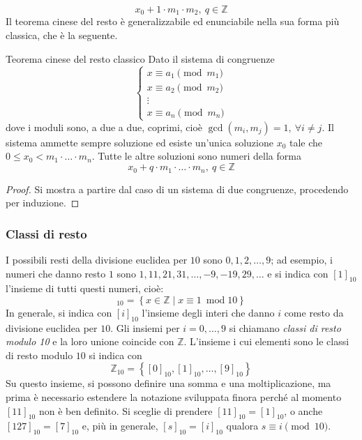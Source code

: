 \documentclass[11pt, a4paper]{scrartcl}
\theoremstyle{definition}
\numberwithin{esempio}{section}
\theoremstyle{definition}
\numberwithin{obs}{section}
\numberwithin{nota}{section}
\numberwithin{equation}{subsection}
\begin{document}
\begin{equation}
x_0 + 1 \cdot m_1\cdot m_2, \ q \in \mathbb{Z}
\end{equation}
Il teorema cinese del resto \`e generalizzabile ed enunciabile nella sua forma pi\`u classica, che \`e la seguente.
\begin{teorema}
	{Teorema cinese del resto classico}{}
Dato il sistema di congruenze
\[
\begin{cases}
	x \equiv a_1 \pmod{m_1} \\
	x \equiv a_2 \pmod{m_2} \\
	\vdots\\
	x\equiv a_n \pmod{m_n} 
\end{cases}
\] 
dove i moduli sono, a due a due, coprimi, cio\`e $\operatorname{gcd}(m_i,m_j) =1, \ \forall i\neq j$.
Il sistema ammette sempre soluzione ed esiste un'unica soluzione $x_0$ tale che $0\le x_0 < m_1 \cdot \ldots \cdot m_n$. 
Tutte le altre soluzioni sono numeri della forma
\[
x_0 + q \cdot  m_1 \cdot  \ldots \cdot  m_n, \ q \in \mathbb{Z}
\] 
\begin{proof}
Si mostra a partire dal caso di un sistema di due congruenze, procedendo per induzione.
\end{proof}
\end{teorema}

\subsubsection{Classi di resto}
I possibili resti della divisione euclidea per $10$ sono $0,1,2,\ldots, 9$; ad esempio, i numeri che danno resto $1$ sono $1,11,21,31,\ldots,-9,-19,29,\ldots$ e si indica con $[1]_{10} $ l'insieme di tutti questi numeri, cio\`e:
\begin{equation}
	[1]_{10} = \left\{ x \in \mathbb{Z}  \mid x\equiv 1 \ \operatorname{mod} 10  \right\} 
\end{equation}
In generale, si indica con $[i]_{10} $ l'insieme degli interi che danno $i$ come resto da divisione euclidea per $10$.
Gli insiemi per $i=0,\ldots,9$ si chiamano \textit{classi di resto modulo 10} e la loro unione coincide con $\mathbb{Z} $. 
L'insieme i cui elementi sono le classi di resto modulo $10$ si indica con 
\begin{equation}
	\mathbb{Z}_{10} = \left\{ [0]_{10} , [1]_{10} , \ldots, [9]_{10}  \right\} 
\end{equation}
Su questo insieme, si possono definire una somma e una moltiplicazione, ma prima \`e necessario estendere la notazione sviluppata finora perch\'e al momento $[11]_{10} $ non \`e ben definito.
Si sceglie di prendere $[11]_{10} = [1]_{10} $, o anche $[127]_{10} = [7]_{10} $ e, pi\`u in generale, $[s]_{10} = [i]_{10} $ qualora $s\equiv i \pmod{10} $.
\end{document}
